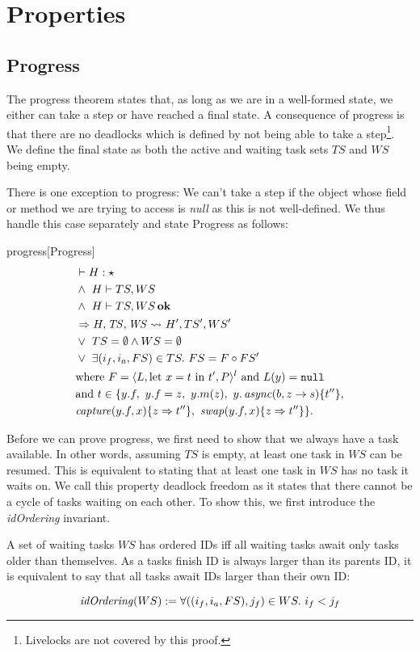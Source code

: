 \chapter{Properties}\label{proper}

\section{Progress}
The progress theorem states that, as long as we are in a well-formed state, we either can take a step or have reached a final state. A consequence of progress is that there are no deadlocks which is defined by not being able to take a step\footnote{Livelocks are not covered by this proof.}. We define the final state as both the active and waiting task sets $TS$ and $WS$ being empty.

There is one exception to progress: We can't take a step if the object whose field or method we are trying to access is \textit{null} as this is not well-defined. We thus handle this case separately and state Progress as follows:

\begin{futuretheorem}{progress}[Progress]
\begin{alignat}{2}
    &\vdash H : \star \label{prog-prem-1}\\
    &\wedge\ H \vdash TS, WS \label{prog-prem-2}\\
    &\wedge\ H \vdash TS, WS \bn{ok} \label{prog-prem-3}\\
    &\Rightarrow \reductasks{}*[H']{}[TS', WS']* \label{prog-concl-1}\\
    &\vee\ TS = \emptyset \wedge WS = \emptyset \label{prog-concl-2}\\
    &\vee\ \exists (i_f, i_a, FS) \in TS.\ FS = F \circ FS'\\
    &\text{where $F = \langle L, \text{let $x = t$ in $t'$}, P \rangle^l$ and $L(y) = \mn{null}$}\\
\nonumber&\text{and $t \in \{y.f,\ y.f = z,\ y.m(z),\ y.\vn{async}(b, z \rightarrow s)\{t''\},$}\\
\nonumber& \text{$\vn{capture}(y.f, x)\{z \Rightarrow t''\},\ \vn{swap}(y.f, x)\{z \Rightarrow t''\}\}$.}
\label{prog-concl-3}
\end{alignat}
\end{futuretheorem}

Before we can prove progress, we first need to show that we always have a task available. In other words, assuming $TS$ is empty, at least one task in $WS$ can be resumed. This is equivalent to stating that at least one task in $WS$ has no task it waits on. We call this property deadlock freedom as it states that there cannot be a cycle of tasks waiting on each other. To show this, we first introduce the \textit{idOrdering} invariant.
\begin{definition}[ID Ordering]
    A set of waiting tasks $WS$ has ordered IDs iff all waiting tasks await only tasks older than themselves. As a tasks finish ID is always larger than its parents ID, it is equivalent to say that all tasks await IDs larger than their own ID:

    \[\mathop{\mathit{idOrdering}}(WS) := \forall ((i_f, i_a, FS),j_f) \in WS.\ i_f < j_f\]
\end{definition}


